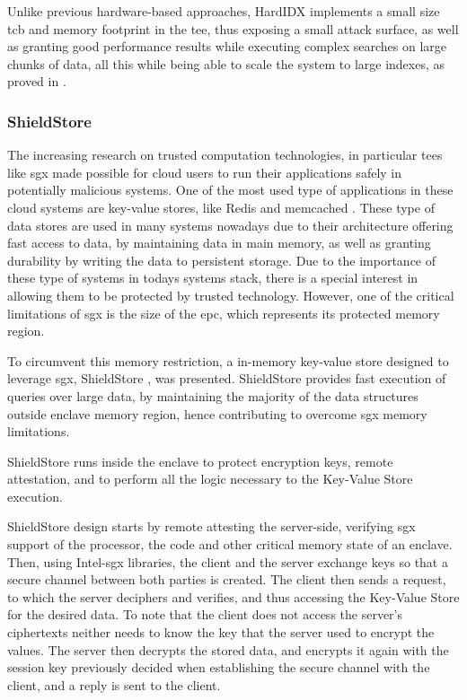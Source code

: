 Unlike previous hardware-based approaches, HardIDX implements a small size \gls{tcb} and memory footprint in the \gls{tee}, thus exposing a small attack surface, as well as granting good performance results while executing complex searches on large chunks of data, all this while being able to scale the system to large indexes, as proved in \cite{hardIDXPaper}. 



\subsubsection{ShieldStore}
The increasing research on trusted computation technologies, in particular \gls{tee}s like \gls{sgx} made possible for cloud users to run their applications safely in potentially malicious systems. One of the most used type of applications in these cloud systems are key-value stores, like Redis \cite{redisWebsite} and memcached \cite{memcachedWebsite}. These type of data stores are used in many systems nowadays due to their architecture offering fast access to data, by maintaining data in main memory, as well as granting durability by writing the data to persistent storage.  Due to the importance of these type of systems in todays systems stack, there is a special interest in allowing them to be protected by trusted technology. However, one of the critical limitations of \gls{sgx} is the size of the \gls{epc}, which represents its protected memory region. 

To circumvent this memory restriction, a in-memory key-value store designed to leverage \gls{sgx}, ShieldStore \cite{shieldStorePaper}, was presented. ShieldStore provides fast execution of queries over large data, by maintaining the majority of the data structures outside enclave memory region, hence contributing to overcome \gls{sgx} memory limitations.

ShieldStore runs inside the enclave to protect encryption keys, remote attestation, and to perform all the logic necessary to the Key-Value Store execution.

ShieldStore design starts by remote attesting the server-side, verifying \gls{sgx} support of the processor, the code and other critical memory state of an enclave. Then, using Intel-\gls{sgx} libraries, the client and the server exchange keys so that a secure channel between both parties is created. The client then sends a request, to which the server deciphers and verifies, and thus accessing the Key-Value Store for the desired data. To note that the client does not access the server's ciphertexts neither needs to know the key that the server used to encrypt the values. The server then decrypts the stored data, and encrypts it again with the session key previously decided when establishing the secure channel with the client, and a reply is sent to the client.    

